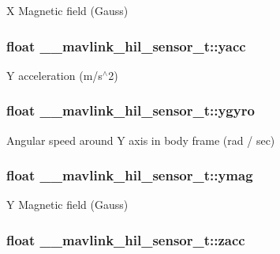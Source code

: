 X Magnetic field (Gauss) 

\hypertarget{struct____mavlink__hil__sensor__t_a3649b04bdbc3d90b3c8da37b6ab02d6c}{
\subsubsection[{yacc}]{\setlength{\rightskip}{0pt plus 5cm}float \+\_\+\+\_\+mavlink\+\_\+hil\+\_\+sensor\+\_\+t\+::yacc}}\label{struct____mavlink__hil__sensor__t_a3649b04bdbc3d90b3c8da37b6ab02d6c}


Y acceleration (m/s$^\wedge$2) 

\hypertarget{struct____mavlink__hil__sensor__t_abdeea02a356a5802b5580fdd945bcbe6}{
\subsubsection[{ygyro}]{\setlength{\rightskip}{0pt plus 5cm}float \+\_\+\+\_\+mavlink\+\_\+hil\+\_\+sensor\+\_\+t\+::ygyro}}\label{struct____mavlink__hil__sensor__t_abdeea02a356a5802b5580fdd945bcbe6}


Angular speed around Y axis in body frame (rad / sec) 

\hypertarget{struct____mavlink__hil__sensor__t_a0693da306eb0d30f2b5502e51540d05b}{
\subsubsection[{ymag}]{\setlength{\rightskip}{0pt plus 5cm}float \+\_\+\+\_\+mavlink\+\_\+hil\+\_\+sensor\+\_\+t\+::ymag}}\label{struct____mavlink__hil__sensor__t_a0693da306eb0d30f2b5502e51540d05b}


Y Magnetic field (Gauss) 

\hypertarget{struct____mavlink__hil__sensor__t_acbecb9b5205c1b4fa0c43c2c45f78b4d}{
\subsubsection[{zacc}]{\setlength{\rightskip}{0pt plus 5cm}float \+\_\+\+\_\+mavlink\+\_\+hil\+\_\+sensor\+\_\+t\+::zacc}}\label{struct____mavlink__hil__sensor__t_acbecb9b5205c1b4fa0c43c2c45f78b4d}


